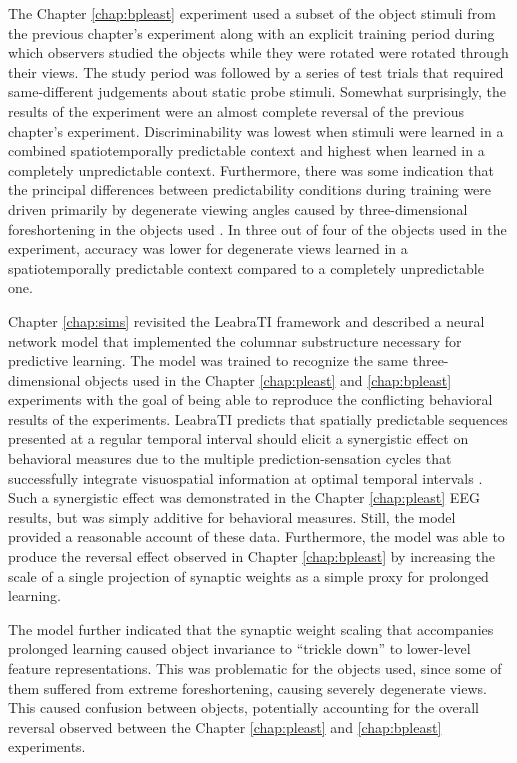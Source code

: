 \documentclass[dwyatte_dissertation.tex]{subfiles}
\begin{document}
The Chapter \ref{chap:bpleast} experiment used a subset of the object stimuli from the previous chapter's experiment along with an explicit training period during which observers studied the objects while they were rotated were rotated through their views. The study period was followed by a series of test trials that required same-different judgements about static probe stimuli. Somewhat surprisingly, the results of the experiment were an almost complete reversal of the previous chapter's experiment. Discriminability was lowest when stimuli were learned in a combined spatiotemporally predictable context and highest when learned in a completely unpredictable context. Furthermore, there was some indication that the principal differences between predictability conditions during training were driven primarily by degenerate viewing angles caused by three-dimensional foreshortening in the objects used \cite{BalasSinha09b,FarahRochlinKlen94,PizloStevenson99}. In three out of four of the objects used in the experiment, accuracy was lower for degenerate views learned in a spatiotemporally predictable context compared to a completely unpredictable one.

Chapter \ref{chap:sims} revisited the LeabraTI framework and described a neural network model that implemented the columnar substructure necessary for predictive learning. The model was trained to recognize the same three-dimensional objects used in the Chapter \ref{chap:pleast} and \ref{chap:bpleast} experiments with the goal of being able to reproduce the conflicting behavioral results of the experiments. LeabraTI predicts that spatially predictable sequences presented at a regular temporal interval should elicit a synergistic effect on behavioral measures due to the multiple prediction-sensation cycles that successfully integrate visuospatial information at optimal temporal intervals \cite[see also]{DohertyRaoMesulamEtAl05,RohenkohlGouldPessoaEtAl14}. Such a synergistic effect was demonstrated in the Chapter \ref{chap:pleast} EEG results, but was simply additive for behavioral measures. Still, the model provided a reasonable account of these data. Furthermore, the model was able to produce the reversal effect observed in Chapter \ref{chap:bpleast} by increasing the scale of a single projection of synaptic weights as a simple proxy for prolonged learning. 

The model further indicated that the synaptic weight scaling that accompanies prolonged learning caused object invariance to ``trickle down'' to lower-level feature representations. This was problematic for the objects used, since some of them suffered from extreme foreshortening, causing severely degenerate views. This caused confusion between objects, potentially accounting for the overall reversal observed between the Chapter \ref{chap:pleast} and \ref{chap:bpleast} experiments.
\end{document}
